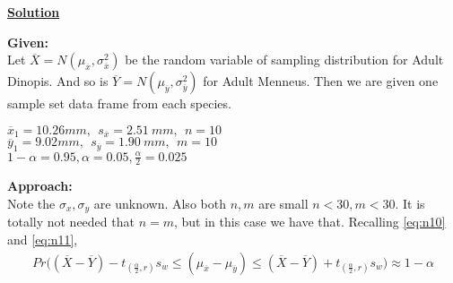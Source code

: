 \documentclass[float=false,crop=false]{standalone}
\begin{document}
    \textbf{\href{https://onlinecourses.science.psu.edu/stat414/node/203/}{Solution}}

\textbf{Given:}\\
Let \(\overline{X} = N(\mu_{\overline{x}},\sigma_{\overline{x}}^2)\) be
the random variable of sampling distribution for Adult Dinopis. And so
is \(\overline{Y} = N(\mu_{\overline{y}},\sigma_{\overline{y}}^2)\) for
Adult Menneus. Then we are given one sample set data frame from each
species.

\(\overline{x}_{1} = 10.26 mm, \ \ s_{\overline{x}}=2.51\ mm, \ \ n = 10\)\\
\(\overline{y}_{1} = 9.02 mm, \ \ s_{\overline{y}}=1.90\ mm, \ \ m = 10\)\\
\(1-\alpha = 0.95, \alpha = 0.05, \frac{\alpha}{2} = 0.025\)

\textbf{Approach:}\\
Note the \(\sigma_{x},\sigma_{y}\) are unknown. Also both \(n,m\) are
small \(n < 30, m < 30\). It is totally not needed that \(n=m\), but in
this case we have that.
Recalling \ref{eq:n10} and \ref{eq:n11},
    \[
    \begin{aligned}
        Pr\Big(  (\overline{X} - \overline{Y}) - t_{(\frac{\alpha}{2},r)}s_w \leq (\mu_{\overline{x}} - \mu_{\overline{y}}) \leq    (\overline{X} - \overline{Y}) + t_{(\frac{\alpha}{2},r)}s_w\Big) \approx 1-\alpha  \nonumber        
    \end{aligned}   
\]
\end{document}
